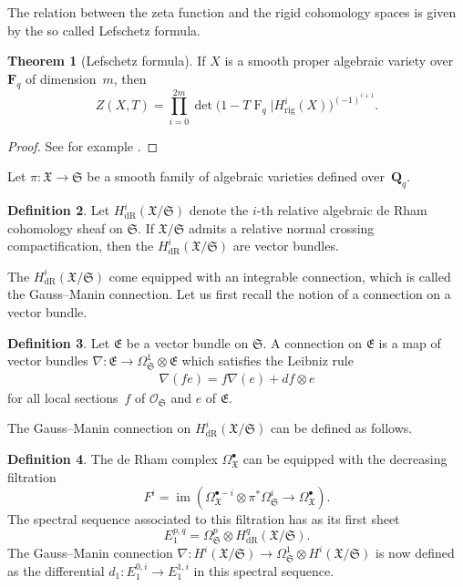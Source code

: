 \documentclass[a4paper,11pt]{article}
\numberwithin{equation}{section}
\newcommand{\QQ}{\mathbf{Q}} %
\newcommand{\FF}{\mathbf{F}} %
\DeclareMathOperator{\fIm}{im}       %
\DeclareMathOperator{\Frob}{F}           %
\providecommand{\HdR}{H_{\text{dR}}}    %
\providecommand{\Hrig}{H_{\text{rig}}}  %
\theoremstyle{definition}
\newtheorem{thm}{Theorem}[section]
\newtheorem{defn}[thm]{Definition}
\begin{document}
The relation between the zeta function and the rigid cohomology spaces 
is given by the so called Lefschetz formula.

\begin{thm}[Lefschetz formula] \label{thm:Lefschetz}
If $X$ is a smooth proper algebraic variety over~$\FF_q$ of dimension~$m$, 
then 
\[
Z(X,T) = \prod_{i=0}^{2m} \det \bigl(1- T \Frob_q | \Hrig^i(X) \bigr)^{(-1)^{i+1}}.
\]
\end{thm}

\begin{proof}
See for example \citep[Theorem 6.3]{EtesseLeStum1993}.
\end{proof}

Let $\pi \colon \mathfrak{X} \rightarrow \mathfrak{S}$ be a smooth family of 
algebraic varieties defined over~$\QQ_q$.

\begin{defn}
Let $\HdR^i(\mathfrak{X}/\mathfrak{S})$ denote the $i$-th relative algebraic 
de Rham cohomology sheaf on $\mathfrak{S}$. 
If $\mathfrak{X}/\mathfrak{S}$ admits a relative normal crossing 
compactification, then the $\HdR^i(\mathfrak{X}/\mathfrak{S})$ are vector bundles.
\end{defn}

The $\HdR^i(\mathfrak{X}/\mathfrak{S})$ come equipped with an integrable 
connection, which is called the Gauss--Manin connection. Let us first recall 
the notion of a connection on a vector bundle.

\begin{defn}
Let $\mathfrak{E}$ be a vector bundle on $\mathfrak{S}$. A connection on 
$\mathfrak{E}$ is a map of vector bundles 
$\nabla \colon \mathfrak{E} \rightarrow \Omega^1_{\mathfrak{S}} \otimes \mathfrak{E}$
which satisfies the Leibniz rule
\begin{align*}
\nabla(f e)=f\nabla(e)+df \otimes e
\end{align*} 
for all local sections~$f$ of $\mathcal{O}_{\mathfrak{S}}$ and $e$ 
of $\mathfrak{E}$.
\end{defn}

The Gauss--Manin connection on $\HdR^i(\mathfrak{X}/\mathfrak{S})$ can 
be defined as follows.

\begin{defn}
The de Rham complex $\Omega^{\bullet}_{\mathfrak{X}}$ can be equipped 
with the decreasing filtration
\[
F^i=\fIm(\Omega^{\bullet-i}_{\mathfrak{X}} \otimes \pi^* \Omega^i_{\mathfrak{S}} \rightarrow \Omega^{\bullet}_{\mathfrak{X}}). 
\]
The spectral sequence associated to this filtration has as its first sheet 
\[
E_1^{p,q}=\Omega^p_{\mathfrak{S}} \otimes \HdR^q(\mathfrak{X}/\mathfrak{S}).
\]
The Gauss--Manin connection 
$\nabla:H^i(\mathfrak{X}/\mathfrak{S}) \rightarrow \Omega^1_{\mathfrak{S}} \otimes H^i(\mathfrak{X}/\mathfrak{S})$ 
is now defined as the differential $d_1 \colon E_1^{0,i} \rightarrow E_1^{1,i}$ 
in this spectral sequence.
\end{defn}
\end{document}

